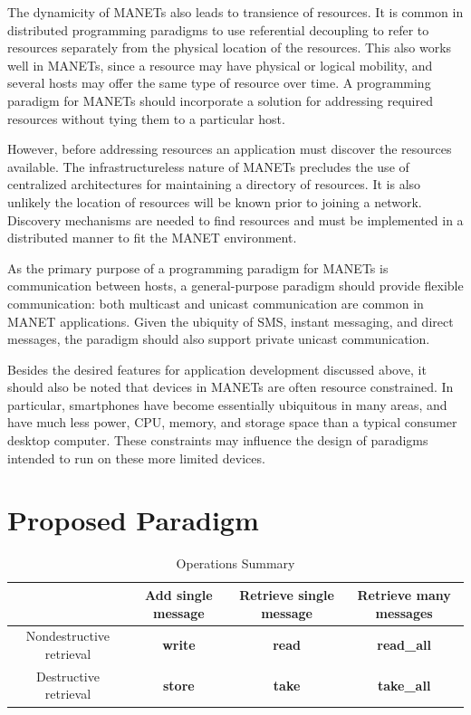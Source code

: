 \documentclass[lnicst]{svmultln}
\begin{document}
The dynamicity of MANETs also leads to transience of resources. It is common in distributed programming paradigms to use referential decoupling to refer to resources separately from the physical location of the resources. This also works well in MANETs, since a resource may have physical or logical mobility, and several hosts may offer the same type of resource over time. A programming paradigm for MANETs should incorporate a solution for addressing required resources without tying them to a particular host.

However, before addressing resources an application must discover the resources available. The infrastructureless nature of MANETs precludes the use of centralized architectures for maintaining a directory of resources. It is also unlikely the location of resources will be known prior to joining a network. Discovery mechanisms are needed to find resources and must be implemented in a distributed manner to fit the MANET environment.

As the primary purpose of a programming paradigm for MANETs is communication between hosts, a general-purpose paradigm should provide flexible communication: both multicast and unicast communication are common in MANET applications. Given the ubiquity of SMS, instant messaging, and direct messages, the paradigm should also support private unicast communication.

Besides the desired features for application development discussed above, it should also be noted that devices in MANETs are often resource constrained. In particular, smartphones have become essentially ubiquitous in many areas, and have much less power, CPU, memory, and storage space than a typical consumer desktop computer. These constraints may influence the design of paradigms intended to run on these more limited devices.

\section{Proposed Paradigm}

\begin{table}
\centering
\caption{Operations Summary}
\begin{tabular}{|c|c|c|c|} \hline
& Add single message & Retrieve single message & Retrieve many messages \\ \hline
Nondestructive retrieval & \textbf{write} & \textbf{read} & \textbf{read\_all} \\ \hline
Destructive retrieval & \textbf{store} & \textbf{take} & \textbf{take\_all} \\ \hline
\end{tabular}
\label{table:opsummary}
\end{table}
\end{document}
